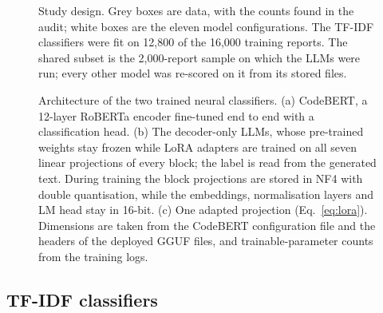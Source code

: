 \documentclass[a4paper,fleqn]{cas-sc}
\begin{document}
\begin{figure}[t]
\caption{Study design. Grey boxes are data, with the counts found in the audit; white
boxes are the eleven model configurations. The TF-IDF classifiers were fit on 12,800 of
the 16,000 training reports. The shared subset is the 2,000-report sample on which the
LLMs were run; every other model was re-scored on it from its stored files.}
\label{fig:design}
\end{figure}

\begin{figure}[t]
\centering

\caption{Architecture of the two trained neural classifiers. (a) CodeBERT, a 12-layer
RoBERTa encoder fine-tuned end to end with a classification head. (b) The decoder-only
LLMs, whose pre-trained weights stay frozen while LoRA adapters are trained on all seven
linear projections of every block; the label is read from the generated text. During
training the block projections are stored in NF4 with double quantisation, while the
embeddings, normalisation layers and LM head stay in 16-bit. (c) One adapted projection
(Eq.~\ref{eq:lora}). Dimensions are taken from the CodeBERT configuration file and the
headers of the deployed GGUF files, and trainable-parameter counts from the training
logs.}
\label{fig:arch}
\end{figure}

\subsection{TF-IDF classifiers}
\end{document}
